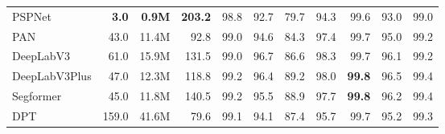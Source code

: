 \begin{table*}[h]
\begin{tabular}{|l rrrrrrrrrr|}
		PSPNet                                                       & \textbf{3.0} & \textbf{0.9M} & \textbf{203.2} & 98.8          & 92.7          & 79.7          & 94.3          & 99.6          & 93.0          & 99.0          \\
		PAN                                                          & 43.0         & 11.4M         & 92.8           & 99.0          & 94.6          & 84.3          & 97.4          & 99.7          & 95.0          & 99.2          \\
		DeepLabV3                                                    & 61.0         & 15.9M         & 131.5          & 99.0          & 96.7          & 86.6          & 98.3          & 99.7          & 96.1          & 99.2          \\
		DeepLabV3Plus                                                & 47.0         & 12.3M         & 118.8          & 99.2          & 96.4          & 89.2          & 98.0          & \textbf{99.8} & 96.5          & 99.4          \\
		Segformer                                                    & 45.0         & 11.8M         & 140.5          & 99.2          & 95.5          & 88.9          & 97.7          & \textbf{99.8} & 96.2          & 99.4          \\
		DPT                                                          & 159.0        & 41.6M         & 79.6           & 99.1          & 94.1          & 87.4          & 95.7          & 99.7          & 95.2          & 99.3          \\
		\hline
	\end{tabular}
\end{table*}